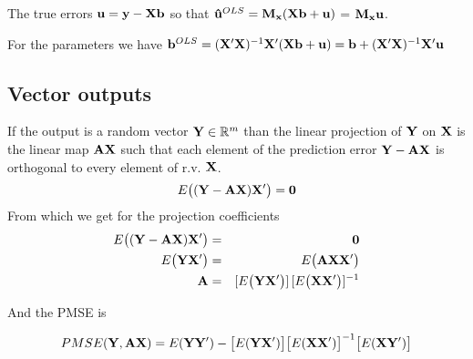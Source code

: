 The true errors $\mathbf{u} = \mathbf{y}-\mathbf{Xb}$ so that $\mathbf{\hat{u}}^{OLS} = \mathbf{M_x} (\mathbf{Xb}+\mathbf{u})$ = $\mathbf{M_x u}$.

For the parameters we have $\mathbf{b}^{OLS} = (\mathbf{X'X})^{-1}\mathbf{X'}(\mathbf{Xb} + \mathbf{u}) = \mathbf{b} + (\mathbf{X'X})^{-1}\mathbf{X' u}$


\subsection{Vector outputs}\label{sec:VecOutput}
If the output is a random vector $\mathbf{Y} \in \mathbb{R}^m$ than the linear projection of $\mathbf{Y}$ on $\mathbf{X}$ is the linear map $\mathbf{A X}$ such that each element of the prediction error $\mathbf{Y} - \mathbf{A X}$ is orthogonal to every element of r.v. $\mathbf{X}$.
\begin{equation}
E\big( (\mathbf{Y}-\mathbf{A X}) \mathbf{X}' \big) = \mathbf{0}
\end{equation}
From which we get for the projection coefficients
\begin{eqnarray}
E\big( (\mathbf{Y}-\mathbf{A X}) \mathbf{X}' \big) & = & \mathbf{0} \nonumber \\
E\big( \mathbf{Y X'} \big) & = & E\big( \mathbf{A X} \mathbf{X}' \big) \nonumber \\
\mathbf{A} & = & [E\big( \mathbf{Y X'} \big)] \, [E\big( \mathbf{X X'} \big)]^{-1}
\end{eqnarray}

And the PMSE is 

\begin{equation}
PMSE(\mathbf{Y},\mathbf{AX}) = 
E(\mathbf{YY'}) - \big[ E(\mathbf{YX'}) \big] \big[ E(\mathbf{XX'}) \big]^{-1}  \big[ E(\mathbf{XY'})  \big]
\end{equation}

